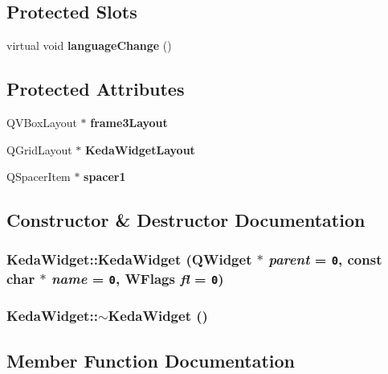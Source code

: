 \subsection*{Protected Slots}
\begin{CompactItemize}
\item 
virtual void {\bf language\-Change} ()
\end{CompactItemize}
\subsection*{Protected Attributes}
\begin{CompactItemize}
\item 
QVBox\-Layout $\ast$ {\bf frame3Layout}
\item 
QGrid\-Layout $\ast$ {\bf Keda\-Widget\-Layout}
\item 
QSpacer\-Item $\ast$ {\bf spacer1}
\end{CompactItemize}


\subsection{Constructor \& Destructor Documentation}
\subsubsection{\setlength{\rightskip}{0pt plus 5cm}Keda\-Widget::Keda\-Widget (QWidget $\ast$ {\em parent} = {\tt 0}, const char $\ast$ {\em name} = {\tt 0}, WFlags {\em fl} = {\tt 0})}\label{classKedaWidget_5963117a5dddd034302ac8d6f682f0b4}


\subsubsection{\setlength{\rightskip}{0pt plus 5cm}Keda\-Widget::$\sim$Keda\-Widget ()}\label{classKedaWidget_13d1dd4c1ddef5897cfc06ab12031d85}




\subsection{Member Function Documentation}
